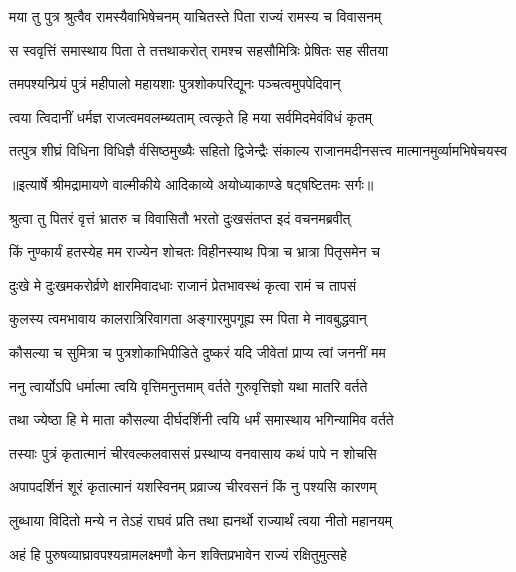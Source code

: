 \twolineshloka
{मया तु पुत्र श्रुत्वैव रामस्यैवाभिषेचनम्}
{याचितस्ते पिता राज्यं रामस्य च विवासनम्} %

\twolineshloka
{स स्ववृत्तिं समास्थाय पिता ते तत्तथाकरोत्}
{रामश्च सहसौमित्रिः प्रेषितः सह सीतया} %

\twolineshloka
{तमपश्यन्प्रियं पुत्रं महीपालो महायशाः}
{पुत्रशोकपरिद्यूनः पञ्चत्वमुपपेदिवान्} %

\twolineshloka
{त्वया त्विदानीं धर्मज्ञ राजत्वमवलम्ब्यताम्}
{त्वत्कृते हि मया सर्वमिदमेवंविधं कृतम्} %

\fourlineindentedshloka
{तत्पुत्र शीघ्रं विधिना विधिज्ञै}
{र्वसिष्ठमुख्यैः सहितो द्विजेन्द्रैः}
{संकाल्य राजानमदीनसत्त्व}
{मात्मानमुर्व्यामभिषेचयस्व} %


{॥इत्यार्षे श्रीमद्रामायणे वाल्मीकीये आदिकाव्ये अयोध्याकाण्डे षट्षष्टितमः सर्गः॥}


\twolineshloka
{श्रुत्वा तु पितरं वृत्तं भ्रातरु च विवासितौ}
{भरतो दुःखसंतप्त इदं वचनमब्रवीत्} %

\twolineshloka
{किं नुण्कार्यं हतस्येह मम राज्येन शोचतः}
{विहीनस्याथ पित्रा च भ्रात्रा पितृसमेन च} %

\twolineshloka
{दुःखे मे दुःखमकरोर्व्रणे क्षारमिवादधाः}
{राजानं प्रेतभावस्थं कृत्वा रामं च तापसं} %

\twolineshloka
{कुलस्य त्वमभावाय कालरात्रिरिवागता}
{अङ्गारमुपगूह्य स्म पिता मे नावबुद्धवान्} %

\twolineshloka
{कौसल्या च सुमित्रा च पुत्रशोकाभिपीडिते}
{दुष्करं यदि जीवेतां प्राप्य त्वां जननीं मम} %

\twolineshloka
{ननु त्वार्योऽपि धर्मात्मा त्वयि वृत्तिमनुत्तमाम्}
{वर्तते गुरुवृत्तिज्ञो यथा मातरि वर्तते} %

\twolineshloka
{तथा ज्येष्ठा हि मे माता कौसल्या दीर्घदर्शिनी}
{त्वयि धर्मं समास्थाय भगिन्यामिव वर्तते} %

\twolineshloka
{तस्याः पुत्रं कृतात्मानं चीरवल्कलवाससं}
{प्रस्थाप्य वनवासाय कथं पापे न शोचसि} %

\twolineshloka
{अपापदर्शिनं शूरं कृतात्मानं यशस्विनम्}
{प्रव्राज्य चीरवसनं किं नु पश्यसि कारणम्} %

\twolineshloka
{लुब्धाया विदितो मन्ये न तेऽहं राघवं प्रति}
{तथा ह्यनर्थो राज्यार्थं त्वया नीतो महानयम्} %

\twolineshloka
{अहं हि पुरुषव्याघ्रावपश्यन्रामलक्ष्मणौ}
{केन शक्तिप्रभावेन राज्यं रक्षितुमुत्सहे} %

